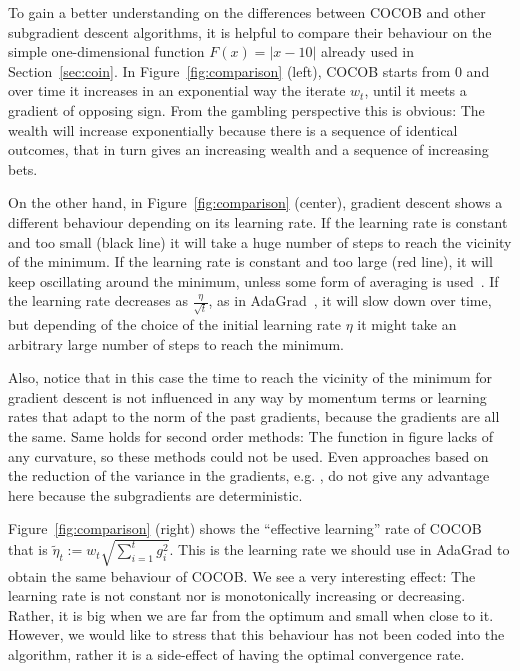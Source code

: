 \documentclass{article}
\begin{document}
To gain a better understanding on the differences between COCOB and other subgradient descent algorithms, it is helpful 
to compare their behaviour on the simple one-dimensional function $F(x)=|x-10|$ already used in Section~\ref{sec:coin}. 
In Figure~\ref{fig:comparison} (left), COCOB starts from 0 and over time it increases in an exponential way 
the iterate $w_t$, until it meets a gradient of opposing sign. From the gambling perspective this is obvious: 
The wealth will increase exponentially because there is a sequence of identical outcomes, that in turn gives 
an increasing wealth and a sequence of increasing bets. 

On the other hand, in Figure~\ref{fig:comparison} (center), gradient descent shows a different behaviour depending on its learning rate. If the learning rate is constant and too small 
(black line) it will take a huge number of steps to reach the vicinity of the minimum. If the learning rate 
is constant and too large (red line), it will keep oscillating around the minimum, unless some form of 
averaging is used~\citep{Zhang04}. If the learning rate decreases as $\tfrac{\eta}{\sqrt{t}}$, as in 
AdaGrad~\citep{DuchiHS11}, it will slow down over time, but depending of the choice of the initial learning 
rate $\eta$ it might take an arbitrary large number of steps to reach the minimum.

Also, notice that in this case the time to reach the vicinity of the minimum for gradient descent is not influenced 
in any way by momentum terms or learning rates that adapt to the norm of the past gradients, because 
the gradients are all the same. Same holds for second order methods: The function in figure lacks of 
any curvature, so these methods could not be used. Even approaches based on the reduction of the variance 
in the gradients, e.g. \citep{JohnsonZ13}, do not give any advantage here because the subgradients are 
deterministic.

Figure~\ref{fig:comparison} (right) shows the ``effective learning'' rate of COCOB that is 
$\tilde{\eta}_t := w_t \sqrt{\sum_{i=1}^t g_i^2}$. This is the learning rate we should use in 
AdaGrad to obtain the same behaviour of COCOB. We see a very interesting effect: The learning rate 
is not constant nor is monotonically increasing or decreasing. Rather, it is big when we are far 
from the optimum and small when close to it. However, we would like to stress that this behaviour 
has not been coded into the algorithm, rather it is a side-effect of having the optimal convergence rate.
\end{document}
